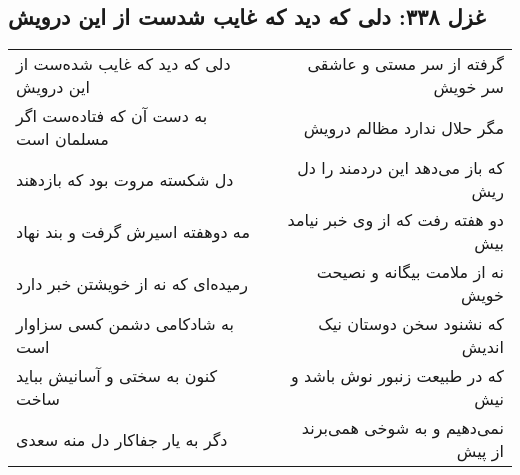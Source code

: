 \begin{center}
\section*{غزل ۳۳۸: دلی که دید که غایب شدست از این درویش}
\label{sec:338}
\begin{longtable}{l p{0.5cm} r}
دلی که دید که غایب شده‌ست از این درویش
&&
گرفته از سر مستی و عاشقی سر خویش
\\
به دست آن که فتاده‌ست اگر مسلمان است
&&
مگر حلال ندارد مظالم درویش
\\
دل شکسته مروت بود که بازدهند
&&
که باز می‌دهد این دردمند را دل ریش
\\
مه دوهفته اسیرش گرفت و بند نهاد
&&
دو هفته رفت که از وی خبر نیامد بیش
\\
رمیده‌ای که نه از خویشتن خبر دارد
&&
نه از ملامت بیگانه و نصیحت خویش
\\
به شادکامی دشمن کسی سزاوار است
&&
که نشنود سخن دوستان نیک اندیش
\\
کنون به سختی و آسانیش بباید ساخت
&&
که در طبیعت زنبور نوش باشد و نیش
\\
دگر به یار جفاکار دل منه سعدی
&&
نمی‌دهیم و به شوخی همی‌برند از پیش
\\
\end{longtable}
\end{center}
